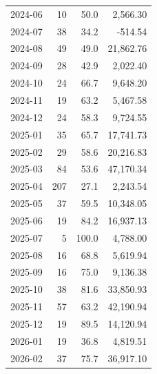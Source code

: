 \documentclass[11pt,a4paper]{article}
\begin{document}
\begin{center}
\begin{tabular}{>{\color{txtmain}}l rrr}
2024-06 & 10 & 50.0 & \textcolor{wingreen}{2,566.30} \\
2024-07 & 38 & 34.2 & \textcolor{lossred}{-514.54} \\
2024-08 & 49 & 49.0 & \textcolor{wingreen}{21,862.76} \\
2024-09 & 28 & 42.9 & \textcolor{wingreen}{2,022.40} \\
2024-10 & 24 & 66.7 & \textcolor{wingreen}{9,648.20} \\
2024-11 & 19 & 63.2 & \textcolor{wingreen}{5,467.58} \\
2024-12 & 24 & 58.3 & \textcolor{wingreen}{9,724.55} \\
2025-01 & 35 & 65.7 & \textcolor{wingreen}{17,741.73} \\
2025-02 & 29 & 58.6 & \textcolor{wingreen}{20,216.83} \\
2025-03 & 84 & 53.6 & \textcolor{wingreen}{47,170.34} \\
2025-04 & 207 & 27.1 & \textcolor{wingreen}{2,243.54} \\
2025-05 & 37 & 59.5 & \textcolor{wingreen}{10,348.05} \\
2025-06 & 19 & 84.2 & \textcolor{wingreen}{16,937.13} \\
2025-07 & 5 & 100.0 & \textcolor{wingreen}{4,788.00} \\
2025-08 & 16 & 68.8 & \textcolor{wingreen}{5,619.94} \\
2025-09 & 16 & 75.0 & \textcolor{wingreen}{9,136.38} \\
2025-10 & 38 & 81.6 & \textcolor{wingreen}{33,850.93} \\
2025-11 & 57 & 63.2 & \textcolor{wingreen}{42,190.94} \\
2025-12 & 19 & 89.5 & \textcolor{wingreen}{14,120.94} \\
2026-01 & 19 & 36.8 & \textcolor{wingreen}{4,819.51} \\
2026-02 & 37 & 75.7 & \textcolor{wingreen}{36,917.10} \\
\bottomrule
\end{tabular}
\end{center}
\end{document}
